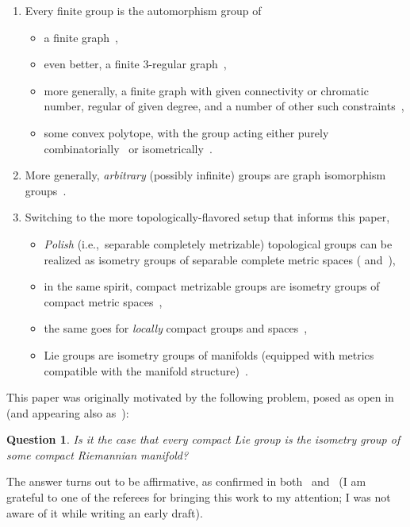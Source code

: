 \documentclass[pdftex]{sigma}%
\numberwithin{equation}{section}
\newtheorem{Question}[Theorem]{Question}
\begin{document}
\begin{enumerate}[(1)]\itemsep=0pt
\item Every finite group is the automorphism group of
 \begin{itemize}\itemsep=0pt
 \item a finite graph~\cite{frcht},
 \item even better, a finite 3-regular graph~\cite[Theorems 2.4 and 4.1]{frcht-3},
 \item more generally, a finite graph with given connectivity or chromatic number, regular of given degree, and a number of other such constraints~\cite[Theorem~1.2]{sabid},
 \item some convex polytope, with the group acting either purely combinatorially~\cite[Theorems 1 and 2]{Schulte:2015eu} or isometrically~\cite[Theorem~1.1]{Doignon:2018ch}.
 \end{itemize}
\item More generally, {\it arbitrary} (possibly infinite) groups are graph isomorphism groups~\cite[Theo\-rem]{sabid-inf}.
\item Switching to the more topologically-flavored setup that informs this paper,
 \begin{itemize}\itemsep=0pt
 \item {\it Polish} (i.e.,~separable completely metrizable) topological groups can be realized as isometry groups of separable complete metric spaces (\cite{gk} and~\cite[Section~3]{mell}),
 \item in the same spirit, compact metrizable groups are isometry groups of compact metric spaces~\cite[Theorem~1.2]{mell},
 \item the same goes for {\it locally} compact groups and spaces~\cite[Theorem~2.1]{ml},
 \item Lie groups are isometry groups of manifolds (equipped with metrics compatible with the manifold structure)~\cite[Corollary~1.2 and discussion following Proposition~1.4]{niem}.
 \end{itemize}
\end{enumerate}
This paper was originally motivated by the following problem, posed as open in~\cite[Section~4]{mell} (and appearing also as~\cite[Question~Q4]{niem}):

\begin{Question}\label{qu:mot}
 Is it the case that every compact Lie group is the isometry group of some compact Riemannian manifold?
\end{Question}

The answer turns out to be affirmative, as confirmed in both~\cite[Theo\-rem~3]{bd} and~\cite[Theo\-rem~1]{sz} (I am grateful to one of the referees for bringing this work to my attention; I was not aware of it while writing an early draft).
\end{document}
